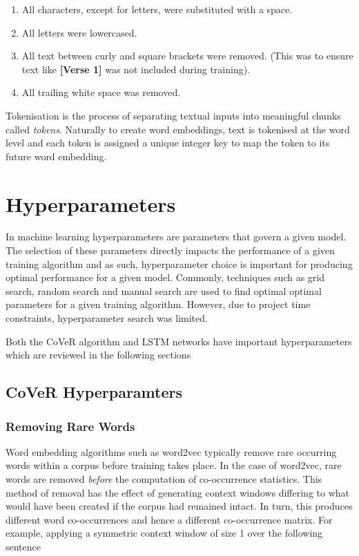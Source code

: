 \begin{enumerate}
	\item All characters, except for letters, were substituted with a space.
	\item All letters were lowercased.
	\item All text between curly and square brackets were removed. (This was to ensure text like \textbf{[Verse 1]} was not included during training).
	\item All trailing white space was removed.
\end{enumerate}

\noindent
\newline
Tokenisation is the process of separating textual inputs into meaningful chunks called \textit{tokens}. Naturally to create word embeddings, text is tokenised at the word level and each token is assigned a unique integer key to map the token to its future word embedding.

\section{Hyperparameters}
In machine learning hyperparameters are parameters that govern a given model. The selection of these parameters directly impacts the performance of a given training algorithm and as such, hyperparameter choice is important for producing optimal performance for a given model. Commonly, techniques such as grid search, random search and manual search are used to find optimal optimal parameters for a given training algorithm. However, due to project time constraints, hyperparameter search was limited.

\noindent
\newline
Both the CoVeR algorithm and LSTM networks have important hyperparameters which are reviewed in the following sections
\subsection{CoVeR Hyperparamters}
\subsubsection{Removing Rare Words}
Word embedding algorithms such as word2vec typically remove rare occurring words within a corpus before training takes place. In the case of word2vec, rare words are removed \textit{before} the computation of co-occurrence statistics. This method of removal has the effect of generating context windows differing to what would have been created if the corpus had remained intact. In turn, this produces different word co-occurrences and hence a different co-occurrence matrix. For example, applying a symmetric context window of size 1 over the following sentence

